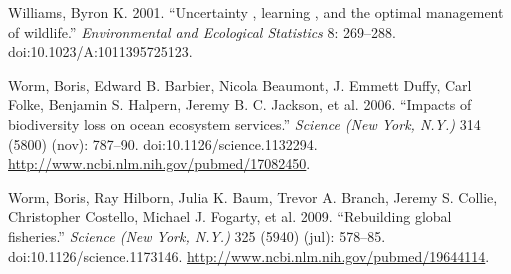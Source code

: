 \documentclass[author-year, review]{elsarticle} %
\begin{document}
Williams, Byron K. 2001. ``Uncertainty , learning , and the optimal
management of wildlife.'' \emph{Environmental and Ecological Statistics}
8: 269--288. doi:10.1023/A:1011395725123.

Worm, Boris, Edward B. Barbier, Nicola Beaumont, J. Emmett Duffy, Carl
Folke, Benjamin S. Halpern, Jeremy B. C. Jackson, et al. 2006. ``Impacts
of biodiversity loss on ocean ecosystem services.'' \emph{Science (New
York, N.Y.)} 314 (5800) (nov): 787--90. doi:10.1126/science.1132294.
\url{http://www.ncbi.nlm.nih.gov/pubmed/17082450}.

Worm, Boris, Ray Hilborn, Julia K. Baum, Trevor A. Branch, Jeremy S.
Collie, Christopher Costello, Michael J. Fogarty, et al. 2009.
``Rebuilding global fisheries.'' \emph{Science (New York, N.Y.)} 325
(5940) (jul): 578--85. doi:10.1126/science.1173146.
\url{http://www.ncbi.nlm.nih.gov/pubmed/19644114}.
\end{document}
